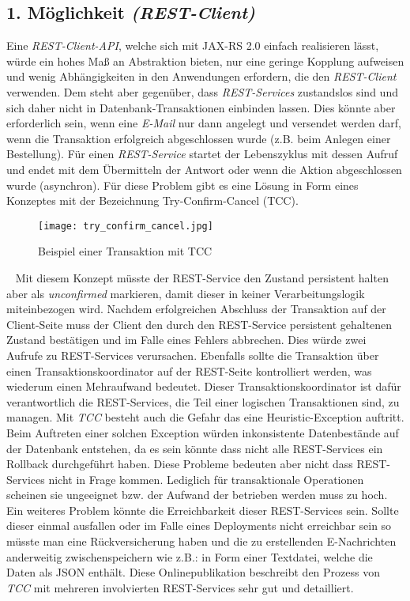 \subsection{1. Möglichkeit \emph{(REST-Client)}}
Eine \emph{REST-Client-API}, welche sich mit JAX-RS 2.0 einfach realisieren lässt, würde ein hohes Maß an Abstraktion bieten, nur eine geringe Kopplung aufweisen und wenig Abhängigkeiten in den Anwendungen erfordern, die den \emph{REST-Client} verwenden. Dem steht aber gegenüber, dass \emph{REST-Services} zustandslos sind und sich daher nicht in Datenbank-Transaktionen einbinden lassen. Dies könnte aber erforderlich sein, wenn eine \emph{E-Mail} nur dann angelegt und versendet werden darf, wenn die Transaktion erfolgreich abgeschlossen wurde (z.B. beim Anlegen einer Bestellung). Für einen \emph{REST-Service} startet der Lebenszyklus mit dessen Aufruf und endet mit dem Übermitteln der Antwort oder wenn die Aktion abgeschlossen wurde (asynchron).
\newpage
Für diese Problem gibt es eine Lösung in Form eines Konzeptes mit der Bezeichnung Try-Confirm-Cancel (TCC).
\begin{figure}[h]
\centering
\texttt{[image: try\_confirm\_cancel.jpg]} %
\caption{Beispiel einer Transaktion mit TCC}
\label{fig:clevermail-rest-tcc}
\end{figure}
\ \newline
Mit diesem Konzept müsste der REST-Service den Zustand persistent halten aber als \emph{unconfirmed} markieren, damit dieser in keiner Verarbeitungslogik miteinbezogen wird. Nachdem erfolgreichen Abschluss der Transaktion auf der Client-Seite muss der Client den durch den REST-Service persistent gehaltenen Zustand bestätigen und im Falle eines Fehlers abbrechen. Dies würde zwei Aufrufe zu REST-Services verursachen. Ebenfalls sollte die Transaktion über einen Transaktionskoordinator auf der REST-Seite kontrolliert werden, was wiederum einen Mehraufwand bedeutet. Dieser Transaktionskoordinator ist dafür verantwortlich die REST-Services, die Teil einer logischen Transaktionen sind,  zu managen. Mit \emph{TCC} besteht auch die Gefahr das eine Heuristic-Exception auftritt. Beim Auftreten einer solchen Exception würden inkonsistente Datenbestände auf der Datenbank entstehen, da es sein könnte dass nicht alle REST-Services ein Rollback durchgeführt haben.
\newline
\newline
Diese Probleme bedeuten aber nicht dass REST-Services nicht in Frage kommen. Lediglich für transaktionale Operationen scheinen sie ungeeignet bzw. der Aufwand der betrieben werden muss zu hoch. Ein weiteres Problem könnte die Erreichbarkeit dieser REST-Services sein. Sollte dieser einmal ausfallen oder im Falle eines Deployments nicht erreichbar sein so müsste man eine Rückversicherung haben und die zu erstellenden E-Nachrichten anderweitig zwischenspeichern wie z.B.: in Form einer Textdatei, welche die Daten als JSON enthält.
\newline
\newline
Diese Onlinepublikation \cite{atomikosTcc} beschreibt den Prozess von \emph{TCC} mit mehreren involvierten REST-Services sehr gut und detailliert.

